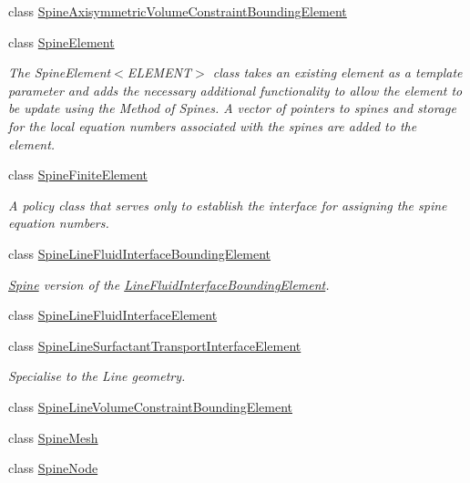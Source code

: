 \begin{DoxyCompactItemize}
class \hyperlink{classoomph_1_1SpineAxisymmetricVolumeConstraintBoundingElement}{Spine\+Axisymmetric\+Volume\+Constraint\+Bounding\+Element}
\item 
class \hyperlink{classoomph_1_1SpineElement}{Spine\+Element}
\begin{DoxyCompactList}\small\item\em The Spine\+Element$<$\+E\+L\+E\+M\+E\+N\+T$>$ class takes an existing element as a template parameter and adds the necessary additional functionality to allow the element to be update using the Method of Spines. A vector of pointers to spines and storage for the local equation numbers associated with the spines are added to the element. \end{DoxyCompactList}\item 
class \hyperlink{classoomph_1_1SpineFiniteElement}{Spine\+Finite\+Element}
\begin{DoxyCompactList}\small\item\em A policy class that serves only to establish the interface for assigning the spine equation numbers. \end{DoxyCompactList}\item 
class \hyperlink{classoomph_1_1SpineLineFluidInterfaceBoundingElement}{Spine\+Line\+Fluid\+Interface\+Bounding\+Element}
\begin{DoxyCompactList}\small\item\em \hyperlink{classoomph_1_1Spine}{Spine} version of the \hyperlink{classoomph_1_1LineFluidInterfaceBoundingElement}{Line\+Fluid\+Interface\+Bounding\+Element}. \end{DoxyCompactList}\item 
class \hyperlink{classoomph_1_1SpineLineFluidInterfaceElement}{Spine\+Line\+Fluid\+Interface\+Element}
\item 
class \hyperlink{classoomph_1_1SpineLineSurfactantTransportInterfaceElement}{Spine\+Line\+Surfactant\+Transport\+Interface\+Element}
\begin{DoxyCompactList}\small\item\em Specialise to the Line geometry. \end{DoxyCompactList}\item 
class \hyperlink{classoomph_1_1SpineLineVolumeConstraintBoundingElement}{Spine\+Line\+Volume\+Constraint\+Bounding\+Element}
\item 
class \hyperlink{classoomph_1_1SpineMesh}{Spine\+Mesh}
\item 
class \hyperlink{classoomph_1_1SpineNode}{Spine\+Node}
\item 

\end{DoxyCompactItemize}
